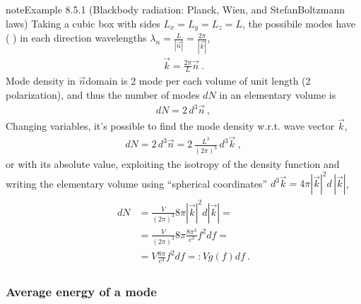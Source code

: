 \documentclass[letterpaper,10pt,english]{jupyterBook}
\begin{document}
\begin{sphinxadmonition}{note}{Example 8.5.1 (Black\sphinxhyphen{}body radiation: Planck, Wien, and Stefan\sphinxhyphen{}Boltzmann laws)}
\sphinxAtStartPar
Taking a cubic box with sides \(L_x = L_y = L_z = L\), the possibile modes have ( ) in each direction wave\sphinxhyphen{}lengths \(\lambda_n = \frac{L}{|\vec{n}|} = \frac{2 \pi}{|\vec{k}|}\),
\begin{equation*}
\begin{split}\vec{k} = \frac{2 \pi}{L} \vec{n} \ .\end{split}
\end{equation*}
\sphinxAtStartPar
Mode density in \(\vec{n}\)\sphinxhyphen{}domain is 2 mode per each volume of unit length (2 polarization), and thus the number of modes \(d N\) in an elementary volume is
\begin{equation*}
\begin{split}d N = 2 \, d^3 \vec{n} \ ,\end{split}
\end{equation*}
\sphinxAtStartPar
Changing variables, it’s possible to find the mode density w.r.t. wave vector \(\vec{k}\),
\begin{equation*}
\begin{split}d N = 2 \, d^3 \vec{n} = 2 \, \frac{L^3}{(2 \pi)^3} \, d^3 \vec{k} \ ,\end{split}
\end{equation*}
\sphinxAtStartPar
or with its absolute value, exploiting the isotropy of the density function \sphinxhyphen{} and writing the elementary volume using “spherical coordinates” \(d^3 \vec{k} = 4 \pi \left| \vec{k} \right|^2 d \, \left| \vec{k} \right|\),
\begin{equation*}
\begin{split}\begin{aligned}
  d N
  & = \frac{V}{(2 \pi)^3} 8 \pi \left| \vec{k} \right|^2 d \left| \vec{k} \right| = \\
  & = \frac{V}{(2 \pi)^3} 8 \pi \frac{8 \pi^3}{c^3} f^2 d f = \\
  & = V \frac{8 \pi}{c^3} f^2 df =: V g(f) df \ .
\end{aligned}\end{split}
\end{equation*}\subsubsection*{Average energy of a mode}


\end{sphinxadmonition}
\end{document}
